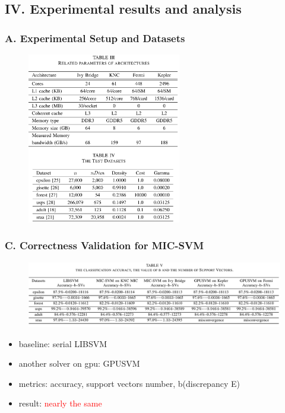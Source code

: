 \documentclass{beamer}
\begin{document}
\subsection{IV. Experimental results and analysis} 
\begin{frame}
	\frametitle{A. Experimental Setup and Datasets}	
	\begin{figure}
		\includegraphics[width=0.6\textwidth]{figs/expsetup.png}
	\end{figure} 
\end{frame}

\begin{frame}
	\frametitle{C. Correctness Validation for MIC-SVM}	
	\begin{figure}
		\includegraphics[width=1\textwidth]{figs/table5_accuracy}
	\end{figure} 
	\begin{itemize}
		\item baseline: serial LIBSVM
		\item another solver on gpu: GPUSVM	
		\item metrics: accuracy, support vectors number, b(discrepancy E)
		\item result: \textcolor{red}{nearly the same}
	\end{itemize}		
\end{frame}
\end{document}
